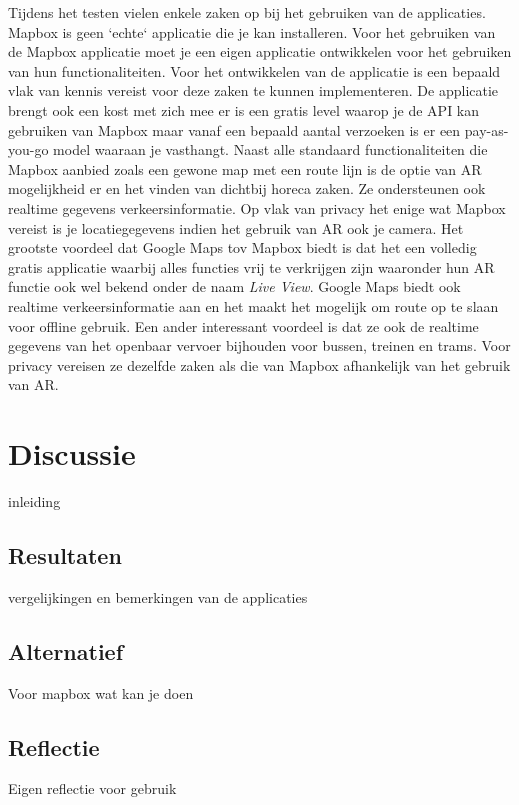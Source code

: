Tijdens het testen vielen enkele zaken op bij het gebruiken van de applicaties. Mapbox is geen `echte` applicatie die je kan installeren. Voor het gebruiken van de Mapbox applicatie moet je een eigen applicatie ontwikkelen voor het gebruiken van hun functionaliteiten. Voor het ontwikkelen van de applicatie is een bepaald vlak van kennis vereist voor deze zaken te kunnen implementeren. De applicatie brengt ook een kost met zich mee er is een gratis level waarop je de API kan gebruiken van Mapbox maar vanaf een bepaald aantal verzoeken is er een pay-as-you-go model waaraan je vasthangt. Naast alle standaard functionaliteiten die Mapbox aanbied zoals een gewone map met een route lijn is de optie van AR mogelijkheid er en het vinden van dichtbij horeca zaken. Ze ondersteunen ook realtime gegevens verkeersinformatie. Op vlak van privacy het enige wat Mapbox vereist is je locatiegegevens indien het gebruik van AR ook je camera. Het grootste voordeel dat Google Maps tov Mapbox biedt is dat het een volledig gratis applicatie waarbij alles functies vrij te verkrijgen zijn waaronder hun AR functie ook wel bekend onder de naam \textit{Live View}. Google Maps biedt ook realtime verkeersinformatie aan en het maakt het mogelijk om route op te slaan voor offline gebruik. Een ander interessant voordeel is dat ze ook de realtime gegevens van het openbaar vervoer bijhouden voor bussen, treinen en trams. Voor privacy vereisen ze dezelfde zaken als die van Mapbox afhankelijk van het gebruik van AR.



\section{Discussie}
\label{sec:discussie}

inleiding

\subsection{Resultaten}
\label{sec:resultaten}

vergelijkingen en bemerkingen van de applicaties

\subsection{Alternatief}
\label{sec:alternatief}

Voor mapbox wat kan je doen

\subsection{Reflectie}
\label{sec:reflectie}

Eigen reflectie voor gebruik